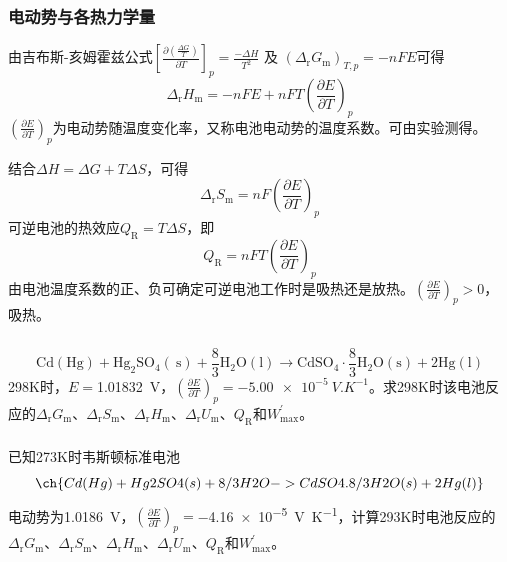 \documentclass[dvipsnames, svgnames, x11names]{beamer}
\begin{document}
\begin{frame}
    \frametitle{电动势与各热力学量}

    由吉布斯-亥姆霍兹公式${\left[\frac{\partial\left(\frac{\Delta G}{T}\right)}{\partial T}\right]_{p}=\frac{-\Delta H}{T^{2}} \text { 及 }(\Delta_{\mathrm{r}} G_{\mathrm{m}})_{T, p}=-n F E}$可得
    \[
        \Delta_{\mathrm{r}} H_{\mathrm{m}}=-n F E+n F T\left(\frac{\partial E}{\partial T}\right)_{p}
    \]
    $\left(\frac{\partial E}{\partial T}\right)_{p}$为电动势随温度变化率，又称电池电动势的温度系数。可由实验测得。

    结合$\Delta H=\Delta G+T \Delta S$，可得
    \[
        \Delta_{\mathrm{r}} S_{\mathrm{m}}=n F\left(\frac{\partial E}{\partial T}\right)_{p} 
    \]
    可逆电池的热效应$Q_{\mathrm{R}}=T \Delta S$，即
    \[
        Q_{\mathrm{R}}=n F T\left(\frac{\partial E}{\partial T}\right)_{p}
    \]
    由电池温度系数的正、负可确定可逆电池工作时是吸热还是放热。$\left(\frac{\partial E}{\partial T}\right)_{p}>0$，吸热。

\end{frame}


\begin{frame}[t]
    \frametitle{}
    
    \begin{example}
        \[
        \mathrm{Cd}(\mathrm{Hg})+\mathrm{Hg}_{2} \mathrm{SO}_{4}(\mathrm{~s})+\frac{8}{3} \mathrm{H}_{2} \mathrm{O}(\mathrm{l}) \longrightarrow \mathrm{CdSO}_{4} \cdot \frac{8}{3} \mathrm{H}_{2} \mathrm{O}(\mathrm{s})+2 \mathrm{Hg}(\mathrm{l})
        \]
        298K时，$E=$\SI{1.01832}{V}，$\left(\frac{\partial E}{\partial T}\right)_{p}=\SI{-5.00e-5}{V.K^{-1}}$。求298K时该电池反应的$\Delta_\mathrm{r}G_\mathrm{m}$、$\Delta_\mathrm{r}S_\mathrm{m}$、$\Delta_\mathrm{r}H_\mathrm{m}$、$\Delta_\mathrm{r}U_\mathrm{m}$、$Q_\mathrm{R}$和$W_\mathrm{max}^{'}$。
    \end{example}

\end{frame}


\begin{frame}[t]
    \frametitle{}

    \begin{example}
        已知273K时韦斯顿标准电池
        \[
            \ch{Cd(Hg) + Hg2SO4 (s) + 8/3 H2O -> CdSO4 . 8/3 H2O (s) + 2 Hg(l)}
        \]
        电动势为\SI{1.0186}{V}，$\left(\frac{\partial E}{\partial T}\right)_p=$\SI{-4.16e-5}{V.K^{-1}}，计算293K时电池反应的$\Delta_\mathrm{r}G_\mathrm{m}$、$\Delta_\mathrm{r}S_\mathrm{m}$、$\Delta_\mathrm{r}H_\mathrm{m}$、$\Delta_\mathrm{r}U_\mathrm{m}$、$Q_\mathrm{R}$和$W_\mathrm{max}^{'}$。
    \end{example}

\end{frame}
\end{document}
